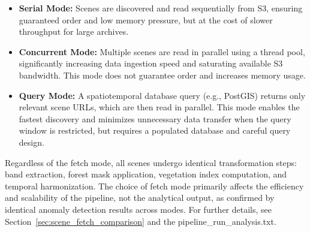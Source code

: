 \begin{itemize}
	\item \textbf{Serial Mode:} Scenes are discovered and read sequentially from S3, ensuring guaranteed order and low memory pressure, but at the cost of slower throughput for large archives.
	\item \textbf{Concurrent Mode:} Multiple scenes are read in parallel using a thread pool, significantly increasing data ingestion speed and saturating available S3 bandwidth. This mode does not guarantee order and increases memory usage.
	\item \textbf{Query Mode:} A spatiotemporal database query (e.g., PostGIS) returns only relevant scene URLs, which are then read in parallel. This mode enables the fastest discovery and minimizes unnecessary data transfer when the query window is restricted, but requires a populated database and careful query design.
\end{itemize}

Regardless of the fetch mode, all scenes undergo identical transformation steps: band extraction, forest mask application, vegetation index computation, and temporal harmonization. The choice of fetch mode primarily affects the efficiency and scalability of the pipeline, not the analytical output, as confirmed by identical anomaly detection results across modes. For further details, see Section~\ref{sec:scene_fetch_comparison} and the pipeline\_run\_analysis.txt.